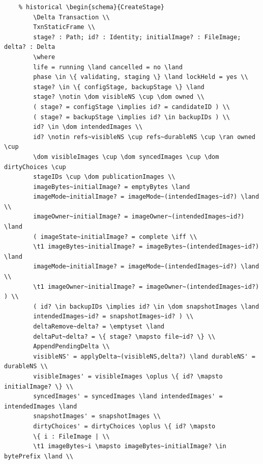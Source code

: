 \documentclass{article}
\begin{document}
\begin{verbatim}
	% historical \begin{schema}{CreateStage}
		\Delta Transaction \\
		TxnStaticFrame \\
		stage? : Path; id? : Identity; initialImage? : FileImage; delta? : Delta
		\where
		life = running \land cancelled = no \land
		phase \in \{ validating, staging \} \land lockHeld = yes \\
		stage? \in \{ configStage, backupStage \} \land
		stage? \notin \dom visibleNS \cup \dom owned \\
		( stage? = configStage \implies id? = candidateID ) \\
		( stage? = backupStage \implies id? \in backupIDs ) \\
		id? \in \dom intendedImages \\
		id? \notin refs~visibleNS \cup refs~durableNS \cup \ran owned \cup
		\dom visibleImages \cup \dom syncedImages \cup \dom dirtyChoices \cup
		stageIDs \cup \dom publicationImages \\
		imageBytes~initialImage? = emptyBytes \land
		imageMode~initialImage? = imageMode~(intendedImages~id?) \land \\
		imageOwner~initialImage? = imageOwner~(intendedImages~id?) \land
		( imageState~initialImage? = complete \iff \\
		\t1 imageBytes~initialImage? = imageBytes~(intendedImages~id?) \land
		imageMode~initialImage? = imageMode~(intendedImages~id?) \land \\
		\t1 imageOwner~initialImage? = imageOwner~(intendedImages~id?) ) \\
		( id? \in backupIDs \implies id? \in \dom snapshotImages \land
		intendedImages~id? = snapshotImages~id? ) \\
		deltaRemove~delta? = \emptyset \land
		deltaPut~delta? = \{ stage? \mapsto file~id? \} \\
		AppendPendingDelta \\
		visibleNS' = applyDelta~(visibleNS,delta?) \land durableNS' = durableNS \\
		visibleImages' = visibleImages \oplus \{ id? \mapsto initialImage? \} \\
		syncedImages' = syncedImages \land intendedImages' = intendedImages \land
		snapshotImages' = snapshotImages \\
		dirtyChoices' = dirtyChoices \oplus \{ id? \mapsto
		\{ i : FileImage | \\
		\t1 imageBytes~i \mapsto imageBytes~initialImage? \in bytePrefix \land \\

\end{verbatim}
\end{document}

